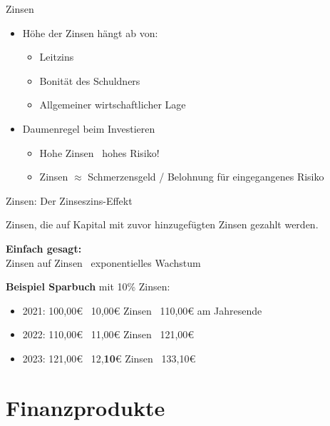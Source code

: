 \documentclass{beamer}
\begin{document}
			\begin{frame}{Zinsen}
				\begin{itemize}
					\item Höhe der Zinsen hängt ab von:
					\begin{itemize}
						\item Leitzins
						\item Bonität des Schuldners
						\item Allgemeiner wirtschaftlicher Lage
					\end{itemize}
					\item Daumenregel beim Investieren
					\begin{itemize}
						\item Hohe Zinsen \textrightarrow\ hohes Risiko!
						\item Zinsen $\approx$ Schmerzensgeld / Belohnung für eingegangenes Risiko
					\end{itemize}
				\end{itemize}
			\end{frame}
		
			\begin{frame}{Zinsen: Der Zinseszins-Effekt}
				\begin{definition}
					Zinsen, die auf Kapital mit zuvor hinzugefügten Zinsen gezahlt werden.
				\end{definition}
				\textbf{Einfach gesagt:}\\
				Zinsen auf Zinsen \textrightarrow\ exponentielles Wachstum\n
				
				\textbf{Beispiel Sparbuch} mit 10\% Zinsen:
				\begin{itemize}
					\item 2021: 100,00€ \textrightarrow\ 10,00€ Zinsen \textrightarrow\ 110,00€ am Jahresende
					\item 2022: 110,00€ \textrightarrow\ 11,00€ Zinsen \textrightarrow\ 121,00€
					\item 2023: 121,00€ \textrightarrow\ 12,\textbf{10}€ Zinsen \textrightarrow\ 133,10€
				\end{itemize}
			\end{frame}
	
	\section{Finanzprodukte}
	
		\begin{frame}
		\end{frame}
	
\end{document}
